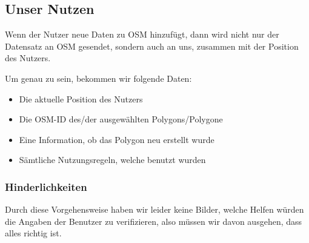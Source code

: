 \subsection{Unser Nutzen}
Wenn der Nutzer neue Daten zu OSM hinzufügt, dann wird nicht nur der Datensatz an OSM gesendet, sondern auch an uns, zusammen mit der Position des Nutzers.

Um genau zu sein, bekommen wir folgende Daten:
\begin{itemize}
\item Die aktuelle Position des Nutzers
\item Die OSM-ID des/der ausgewählten Polygons/Polygone
\item Eine Information, ob das Polygon neu erstellt wurde
\item Sämtliche Nutzungsregeln, welche benutzt wurden
\end{itemize}

\subsubsection{Hinderlichkeiten}
Durch diese Vorgehensweise haben wir leider keine Bilder, welche Helfen würden die Angaben der Benutzer zu verifizieren,
also müssen wir davon ausgehen, dass alles richtig ist.